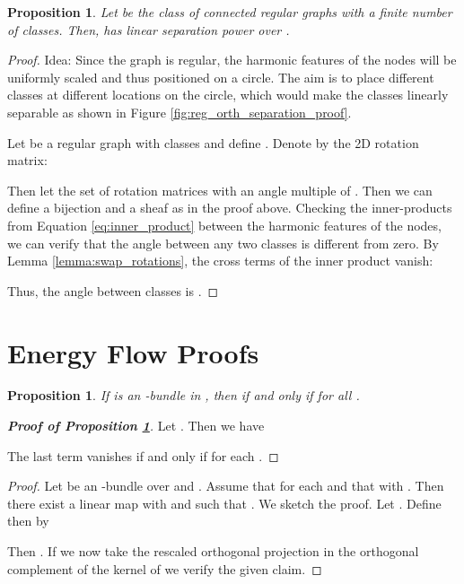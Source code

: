 \documentclass{article}
\newtheorem{proposition}[theorem]{Proposition}
\begin{document}
\begin{proposition}\label{prop:regular_orth_separation}
Let  be the class of connected regular graphs with a finite number of classes. Then,  has linear separation power over . 
\end{proposition}

\begin{proof}
Idea: Since the graph is regular, the harmonic features of the nodes will be uniformly scaled and thus positioned on a circle. The aim is to place different classes at different locations on the circle, which would make the classes linearly separable as shown in Figure \ref{fig:reg_orth_separation_proof}. 

Let  be a regular graph with  classes and define . Denote by  the 2D rotation matrix:

Then let  the set of rotation matrices with an angle multiple of . Then we can define a bijection  and a sheaf  as in the proof above. Checking the inner-products from Equation \ref{eq:inner_product} between the harmonic features of the nodes, we can verify that the angle between any two classes is different from zero. By Lemma \ref{lemma:swap_rotations}, the cross terms of the inner product vanish:

Thus, the angle between classes  is . 
\end{proof}



\section{Energy Flow Proofs}\label{app:energy_flow}

\begin{proposition}\label{prop:harmonicbundle}
If  is an -bundle in , then  if and only if  for all .
\end{proposition}

\begin{proof}[\textbf{Proof of Proposition \ref{prop:harmonicbundle}}] Let . Then we have

\noindent The last term vanishes if and only if  for each .
\end{proof}


\SCNEnergyIncrease*

\begin{proof}
Let  be an -bundle over  and . Assume that  for each  and that  with . Then there exist a linear map  with  and  such that . We sketch the proof. Let . Define then  by

\noindent Then . If we now take  the rescaled orthogonal projection in the orthogonal complement of the kernel of  we verify the given claim.
\end{proof}
\end{document}
